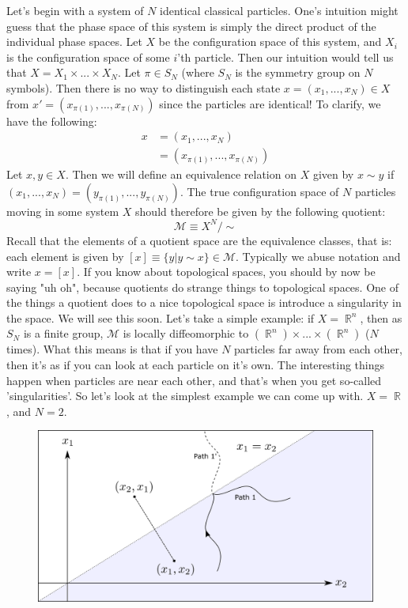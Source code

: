 \documentclass{article}
\DeclareMathOperator{\RR}{\mathbb{R}}
\begin{document}
Let's begin with a system of $N$ identical classical particles. One's intuition might guess that the phase space of this system is simply the direct product of the individual phase spaces. Let $X$ be the configuration space of this system, and $X_i$ is the configuration space of some $i$'th particle. Then our intuition would tell us that $X = X_1 \times ... \times X_N$. Let $\pi \in S_N$ (where $S_N$ is the symmetry group on $N$ symbols). Then there is no way to distinguish each state $x = (x_1,...,x_N) \in X$ from $x' = (x_{\pi(1)},...,x_{\pi(N)})$ since the particles are identical!  To clarify, we have the following:
\begin{align*}
    x &= (x_1,...,x_N) \\
      &= (x_{\pi(1)}, ... , x_{\pi(N)})
\end{align*}
Let $x, y \in X$. Then we will define an equivalence relation on $X$ given by $x \sim y$ if $(x_1,...,x_N) = (y_{\pi(1)},...,y_{\pi(N)})$. The true configuration space of $N$ particles moving in some system $X$ should therefore be given by the following quotient:
\[\mathcal{M} \equiv X^N / \sim\]
Recall that the elements of a quotient space are the equivalence classes, that is: each element is given by $[x] \equiv \{y | y \sim x\} \in \mathcal{M}$. Typically we abuse notation and write $x = [x]$. If you know about topological spaces, you should by now be saying "uh oh", because quotients do strange things to topological spaces. One of the things a quotient does to a nice topological space is introduce a singularity in the space. We will see this soon. Let's take a simple example: if $X = \RR^n$, then as $S_N$ is a finite group, $\mathcal{M}$ is locally diffeomorphic to $(\RR^n) \times ... \times (\RR^n)$ ($N$ times). What this means is that if you have $N$ particles far away from each other, then it's as if you can look at each particle on it's own. The interesting things happen when particles are near each other, and that's when you get so-called 'singularities'. So let's look at the simplest example we can come up with. $X = \RR$, and $N = 2$.
\pagebreak
\begin{figure}[ht]
    \centering
    \includegraphics[width=\linewidth]{Figures/figure2.png}
    \caption*{}
    \label{fig:fig12}
\end{figure}
\end{document}
